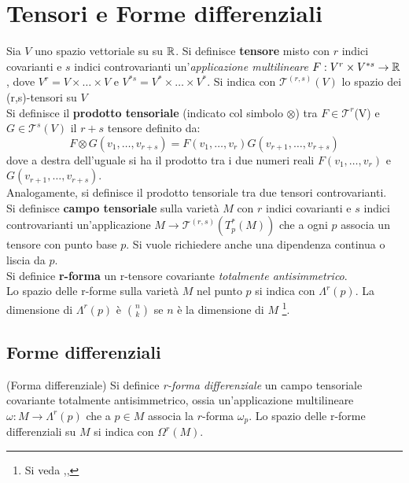 \section{Tensori e Forme differenziali}
Sia $V$ uno spazio vettoriale su su $\mathbb{R}$.
Si definisce \textbf{tensore} misto con $r$ indici covarianti e $s$ indici
controvarianti un'\emph{applicazione multilineare} $F : V^r \times V^{*s} \to
\mathbb{R}$ , dove $V^r = V \times \dots \times V$ e
$V^{*s} =  V^* \times \dots \times V^*$.
Si indica con $\mathcal{T}^{(r,s)}(V)$ lo spazio dei (r,s)-tensori su $V$\\

Si definisce il \textbf{prodotto tensoriale} (indicato col simbolo $\otimes$) tra
$F \in \mathcal{T}^r$(V) e $G \in \mathcal{T}^s(V)$ il $r+s$ tensore definito da:
$$ F \otimes G (v_1,\dots,v_{r+s}) = F(v_1,\dots,v_r)G(v_{r+1},\dots,v_{r+s})$$
dove a destra dell'uguale si ha il prodotto tra i due numeri reali
$F(v_1,\dots,v_r)$ e $G(v_{r+1},\dots,v_{r+s})$.\\
Analogamente, si definisce il prodotto tensoriale tra due tensori controvarianti.\\

Si definisce \textbf{campo tensoriale} sulla varietà $M$ con $r$ indici covarianti
e $s$ indici controvarianti un'applicazione $ M \to \mathcal{T}^{(r,s)}(T_p^*(M)) $
che a ogni $p$ associa un tensore con punto base $p$. Si vuole richiedere anche
una dipendenza continua o liscia da $p$.\\

Si definice \textbf{r-forma} un r-tensore covariante \emph{totalmente antisimmetrico}.\\

Lo spazio delle r-forme sulla varietà $M$ nel punto $p$ si indica con $\Lambda^r(p)$.
La dimensione di $\Lambda^r(p)$ è ${n}\choose{k}$ se $n$ è la dimensione di $M$
\footnote{ Si veda \cite{sernesi},\cite{boothby},\cite{nakahara} }.
\subsection{Forme differenziali}
\begin{definition}{(Forma differenziale)}
   Si definice \emph{r-forma differenziale} un campo tensoriale covariante
  totalmente antisimmetrico, ossia un'applicazione multilineare
  $\omega : M \to \Lambda^r(p)$ che a $p \in M$ associa la $r$-forma $\omega_p$.
  Lo spazio delle r-forme differenziali su $M$ si indica con $\Omega^r(M)$.
\end{definition}

